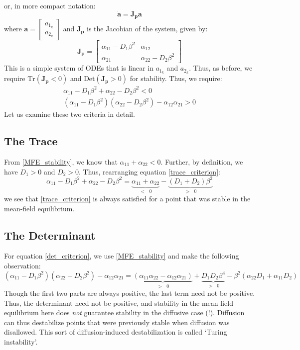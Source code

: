or, in more compact notation:
\begin{equation*}
	\dot{\mathbf{a}}=\mathbf{J_p}\mathbf{a}
\end{equation*}
where $\mathbf{a} = \begin{bmatrix}
	{a_{1_k}}\\
	{a_{2_k}}
\end{bmatrix}$ and $\mathbf{J_p}$ is the Jacobian of the system, given by:
\begin{equation}
	\label{jacobian}
	\mathbf{J_p} = 
	\begin{bmatrix}
		\alpha_{11} - D_1\beta^2 & \alpha_{12}\\
		\alpha_{21} & \alpha_{22} - D_2\beta^2
	\end{bmatrix}
\end{equation}
This is a simple system of ODEs that is linear in $a_{1_k}$ and $a_{2_k}$. Thus, as before, we require $\mathrm{Tr}(\mathbf{J_p} < 0)$ and $\mathrm{Det}(\mathbf{J_p} > 0)$ for stability. Thus, we require:
\begin{align}
	\alpha_{11} - D_1\beta^2 + \alpha_{22} - D_2\beta^2 < 0 \label{trace_criterion}\\
	(\alpha_{11} - D_1\beta^2)(\alpha_{22} - D_2\beta^2) - \alpha_{12}\alpha_{21} > 0 \label{det_criterion}
\end{align}
Let us examine these two criteria in detail.
\medskip
\subsection{The Trace}
From \eqref{MFE_stability}, we know that $\alpha_{11} + \alpha_{22} < 0$. Further, by definition, we have $D_1 > 0$ and $D_2 > 0$. Thus, rearranging equation \eqref{trace_criterion}:
\begin{equation*}
	\alpha_{11} - D_1\beta^2 + \alpha_{22} - D_2\beta^2 = \underbrace{\alpha_{11} + \alpha_{22}}_{<\text{ }0} - \underbrace{(D_1+ D_2)\beta^2}_{>\text{ }0}
\end{equation*}
we see that \eqref{trace_criterion} is always satisfied for a point that was stable in the mean-field equilibrium.
\medskip
\subsection{The Determinant}
For equation \eqref{det_criterion}, we use \eqref{MFE_stability} and make the following observation:
\begin{equation*}
	(\alpha_{11} - D_1\beta^2)(\alpha_{22} - D_2\beta^2) - \alpha_{12}\alpha_{21} = \underbrace{(\alpha_{11}\alpha_{22} - \alpha_{12}\alpha_{21})}_{> \text{ } 0} + \underbrace{D_{1}D_{2}\beta^4}_{> \text{ } 0} - \beta^{2}(\alpha_{22}D_1 + \alpha_{11}D_2)
\end{equation*}
Though the first two parts are always positive, the last term need not be positive. Thus, the determinant need not be positive, and stability in the mean field equilibrium here does \textit{not} guarantee stability in the diffusive case (!). Diffusion can thus destabilize points that were previously stable when diffusion was disallowed. This sort of diffusion-induced destabilization is called `Turing instability'.
\medskip
